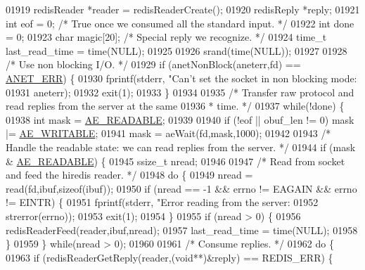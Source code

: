 \begin{DoxyCode}
{{{{{{{{{{{{{{{{{{{{{{{{{{{{{{{{{{{{{{{{{{{{{{{{{{{{01919     redisReader *reader = redisReaderCreate();
01920     redisReply *reply;
01921     \textcolor{keywordtype}{int} eof = 0; \textcolor{comment}{/* True once we consumed all the standard input. */}
01922     \textcolor{keywordtype}{int} done = 0;
01923     \textcolor{keywordtype}{char} magic[20]; \textcolor{comment}{/* Special reply we recognize. */}
01924     time\_t last\_read\_time = time(NULL);
01925 
01926     srand(time(NULL));
01927 
01928     \textcolor{comment}{/* Use non blocking I/O. */}
01929     \textcolor{keywordflow}{if} (anetNonBlock(aneterr,fd) == \hyperlink{anet_8h_a0697b7774a7e0f4ef141839fe93536fe}{ANET\_ERR}) \{
01930         fprintf(stderr, \textcolor{stringliteral}{"Can't set the socket in non blocking mode: %
01931             aneterr);
01932         exit(1);
01933     \}
01934 
01935     \textcolor{comment}{/* Transfer raw protocol and read replies from the server at the same}
01936 \textcolor{comment}{     * time. */}
01937     \textcolor{keywordflow}{while}(!done) \{
01938         \textcolor{keywordtype}{int} mask = \hyperlink{ae_8h_a7a9a2162d007d09739955b4e55c65bf3}{AE\_READABLE};
01939 
01940         \textcolor{keywordflow}{if} (!eof || obuf\_len != 0) mask |= \hyperlink{ae_8h_ab6bfb0366ccb6277112d132c2a2bf500}{AE\_WRITABLE};
01941         mask = aeWait(fd,mask,1000);
01942 
01943         \textcolor{comment}{/* Handle the readable state: we can read replies from the server. */}
01944         \textcolor{keywordflow}{if} (mask & \hyperlink{ae_8h_a7a9a2162d007d09739955b4e55c65bf3}{AE\_READABLE}) \{
01945             ssize\_t nread;
01946 
01947             \textcolor{comment}{/* Read from socket and feed the hiredis reader. */}
01948             \textcolor{keywordflow}{do} \{
01949                 nread = read(fd,ibuf,\textcolor{keyword}{sizeof}(ibuf));
01950                 \textcolor{keywordflow}{if} (nread == -1 && errno != EAGAIN && errno != EINTR) \{
01951                     fprintf(stderr, \textcolor{stringliteral}{"Error reading from the server: %
01952                         strerror(errno));
01953                     exit(1);
01954                 \}
01955                 \textcolor{keywordflow}{if} (nread > 0) \{
01956                     redisReaderFeed(reader,ibuf,nread);
01957                     last\_read\_time = time(NULL);
01958                 \}
01959             \} \textcolor{keywordflow}{while}(nread > 0);
01960 
01961             \textcolor{comment}{/* Consume replies. */}
01962             \textcolor{keywordflow}{do} \{
01963                 \textcolor{keywordflow}{if} (redisReaderGetReply(reader,(\textcolor{keywordtype}{void}**)&reply) == REDIS\_ERR) \{
}}}}}}}}}}}}}}}}}}}}}}}}}}}}}}}}}}}}}}}}}}}}}}}}}}}}}}
\end{DoxyCode}
